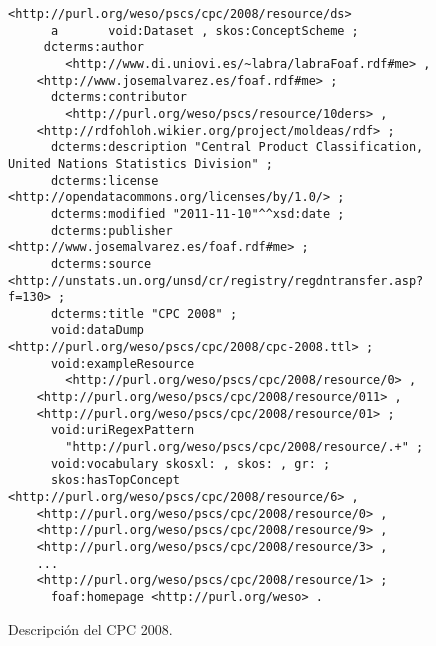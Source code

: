 \begin{figure}[!htp]
\begin{lstlisting} 
<http://purl.org/weso/pscs/cpc/2008/resource/ds>
      a       void:Dataset , skos:ConceptScheme ;
     dcterms:author 
        <http://www.di.uniovi.es/~labra/labraFoaf.rdf#me> , 
	<http://www.josemalvarez.es/foaf.rdf#me> ;
      dcterms:contributor
        <http://purl.org/weso/pscs/resource/10ders> ,
	<http://rdfohloh.wikier.org/project/moldeas/rdf> ;
      dcterms:description "Central Product Classification, United Nations Statistics Division" ;
      dcterms:license <http://opendatacommons.org/licenses/by/1.0/> ;
      dcterms:modified "2011-11-10"^^xsd:date ;
      dcterms:publisher <http://www.josemalvarez.es/foaf.rdf#me> ;
      dcterms:source <http://unstats.un.org/unsd/cr/registry/regdntransfer.asp?f=130> ;
      dcterms:title "CPC 2008" ;
      void:dataDump <http://purl.org/weso/pscs/cpc/2008/cpc-2008.ttl> ;
      void:exampleResource
        <http://purl.org/weso/pscs/cpc/2008/resource/0> , 
	<http://purl.org/weso/pscs/cpc/2008/resource/011> , 
	<http://purl.org/weso/pscs/cpc/2008/resource/01> ;
      void:uriRegexPattern
        "http://purl.org/weso/pscs/cpc/2008/resource/.+" ;
      void:vocabulary skosxl: , skos: , gr: ;
      skos:hasTopConcept <http://purl.org/weso/pscs/cpc/2008/resource/6> , 
	<http://purl.org/weso/pscs/cpc/2008/resource/0> ,
	<http://purl.org/weso/pscs/cpc/2008/resource/9> , 
	<http://purl.org/weso/pscs/cpc/2008/resource/3> , 
	...
	<http://purl.org/weso/pscs/cpc/2008/resource/1> ;
      foaf:homepage <http://purl.org/weso> .
\end{lstlisting}
	\caption{Descripción del \dataset CPC 2008.}
	\label{fig:pscs-ds-cpc-2003}
\end{figure}



